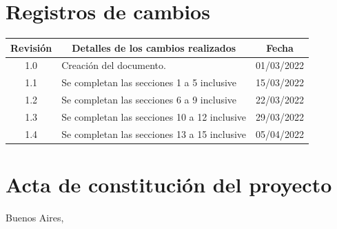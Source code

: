 \documentclass[
11pt, %
codirector, %
]{charter}
\begin{document}
\maketitle
\thispagestyle{empty}
\pagebreak


\thispagestyle{empty}
{\setlength{\parskip}{0pt}
\tableofcontents{}
}
\pagebreak


\section*{Registros de cambios}
\label{sec:registro}


\begin{table}[ht]
\label{tab:registro}
\centering
\begin{tabularx}{\linewidth}{@{}|c|X|c|@{}}
\hline
\rowcolor[HTML]{C0C0C0} 
Revisión & \multicolumn{1}{c|}{\cellcolor[HTML]{C0C0C0}Detalles de los cambios realizados} & Fecha      \\ \hline
1.0	& Creación del documento.				& 01/03/2022 \\ \hline
1.1	& Se completan las secciones 1 a 5 inclusive		& 15/03/2022 \\ \hline
1.2	& Se completan las secciones 6 a 9 inclusive                & 22/03/2022 \\ \hline
1.3     & Se completan las secciones 10 a 12 inclusive		& 29/03/2022 \\ \hline
1.4	& Se completan las secciones 13 a 15 inclusive		& 05/04/2022 \\ \hline
\end{tabularx}
\end{table}

\pagebreak



\section*{Acta de constitución del proyecto}
\label{sec:acta}

\begin{flushright}
Buenos Aires, \fechaInicioName
\end{flushright}
\end{document}
